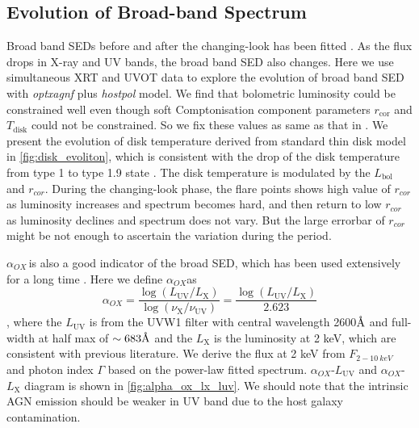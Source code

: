 \documentclass[twocolumn]{aastex63}
\newcommand{\alphaox}{$\alpha_{OX}$}
\newcommand{\angstrom}{\text{\normalfont\AA}}
\begin{document}
\subsection{Evolution of Broad-band Spectrum}
\label{subsec:xray-uvot-sed}
Broad band SEDs before and after the changing-look has been fitted \citep{2016A&A...593L...9H}. As the flux drops in X-ray and UV bands, the broad band SED also changes. Here we use simultaneous XRT and UVOT data to explore the evolution of broad band SED with {\it optxagnf} plus {\it hostpol} model. We find that bolometric luminosity could be constrained well even though soft Comptonisation component parameters $r_\mathrm{cor}$ and $T_\mathrm{disk}$ could not be constrained. So we fix these values as same as that in \citet{2018MNRAS.480.3898N}. We present the evolution of disk temperature derived from standard thin disk model in \autoref{fig:disk_evoliton}, which is consistent with the drop of the disk temperature from type 1 to type 1.9 state \citep[also described in][]{2016A&A...593L...9H}. The disk temperature is modulated by the $L_\mathrm{bol}$ and $r_{cor}$. During the changing-look phase, the flare points shows high value of $r_{cor}$ as luminosity increases and spectrum becomes hard, and then return to low $r_{cor}$ as luminosity declines and spectrum does not vary. But the large errorbar of $r_{cor}$ might be not enough to ascertain the variation during the period.

 \alphaox \,is also a good indicator of the broad SED, which has been used extensively for a long time \citep[e.g.][]{1979ApJ...234L...9T}. Here we define \alphaox as 
\begin{equation}
\alpha_{OX} = \frac{\log (L_\mathrm{UV} / L_\mathrm{X} )} {\log (\nu_\mathrm{X} /  \nu_\mathrm{UV} )}=\frac{\log (L_\mathrm{UV} / L_\mathrm{X} )}{2.623}
\label{definition_alpha_ox}
\end{equation}
, where the $L_\mathrm{UV}$ is from the UVW1 filter with central wavelength {2600{$\angstrom$}} and full-width at half max of $\sim 683\angstrom$ \citep{2008MNRAS.383..627P} and the $L_\mathrm{X}$ is the luminosity at 2 keV, which are consistent with previous literature. We derive the flux at 2 keV from $F_{2-10~ keV}$ and  photon index $\Gamma$ based on the power-law fitted spectrum. \alphaox-$L_\mathrm{UV}$ and \alphaox-$L_\mathrm{X}$ diagram is shown in \autoref{fig:alpha_ox_lx_luv}. We should note that the intrinsic AGN emission should be weaker in UV band due to the host galaxy contamination. 
\end{document}
